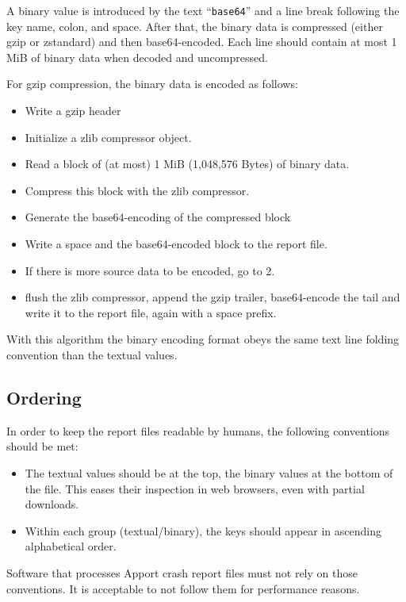 \documentclass[DIV12,halfparskip]{scrartcl}
\begin{document}
A binary value is introduced by the text ``\verb!base64!'' and a line break
following the key name, colon, and space. After that, the binary data is
compressed (either gzip or zstandard) and then base64-encoded. Each line
should contain at most 1 MiB of binary data when decoded and uncompressed.

For gzip compression, the binary data is encoded as follows:

\begin{itemize}
    \item Write a gzip header
    \item Initialize a zlib compressor object.
    \item Read a block of (at most) 1 MiB (1,048,576 Bytes) of binary data.
    \item Compress this block with the zlib compressor.
    \item Generate the base64-encoding of the compressed block
    \item Write a space and the base64-encoded block to the report file.
    \item If there is more source data to be encoded, go to 2.
    \item flush the zlib compressor, append the gzip trailer, base64-encode the
    tail and write it to the report file, again with a space prefix.
\end{itemize}

With this algorithm the binary encoding format obeys the same text line folding
convention than the textual values.

\subsection{Ordering}

In order to keep the report files readable by humans, the following conventions
should be met:

\begin{itemize}
    \item The textual values should be at the top, the binary values at the
    bottom of the file. This eases their inspection in web browsers, even with
    partial downloads.
    \item Within each group (textual/binary), the keys should appear in
    ascending alphabetical order.
\end{itemize}

Software that processes Apport crash report files must not rely on those
conventions. It is acceptable to not follow them for performance reasons.
\end{document}
